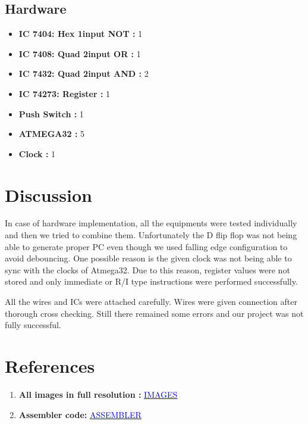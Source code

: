 \documentclass[12pt]{article}
\begin{document}
\subsection{Hardware}

\begin{itemize}
    \item \textbf{IC 7404: Hex 1input NOT : } 1
    \item \textbf{IC 7408: Quad 2input OR : } 1
    \item \textbf{IC 7432: Quad 2input AND : } 2
    \item \textbf{IC 74273: Register : } 1
    \item \textbf{Push Switch : } 1
    \item \textbf{ATMEGA32 : } 5
    \item \textbf{Clock : } 1
    
\end{itemize}

\section{Discussion}
In case of hardware implementation, all the equipments were tested individually and then we tried to combine them. Unfortunately the D flip flop was not being able to generate proper PC even though we used falling edge configuration to avoid debouncing. One possible reason is the given clock was not being able to sync with the clocks of Atmega32. Due to this reason, register values were not stored and only immediate or R/I type instructions were performed successfully.

All the wires and ICs were attached carefully. Wires were given connection after thorough cross checking. Still there remained some errors and our project was not fully successful.

\section{References}
\begin{enumerate}
    \item \textbf{All images in full resolution : }  \href{https://drive.google.com/drive/folders/1C4mjVRfIBffSrGZZEEEl85NEq3H7LgYy?usp=share_link}{\textcolor{blue}{\underline{IMAGES}}}
    \item \textbf{Assembler code: }
    \href{https://drive.google.com/file/d/1huQxe8--XFIrjrw-dRG1LzcaEkW_kyHk/view?usp=share_link}{\textcolor{blue}{\underline{ASSEMBLER}}}
     
\end{enumerate}
\end{document}
